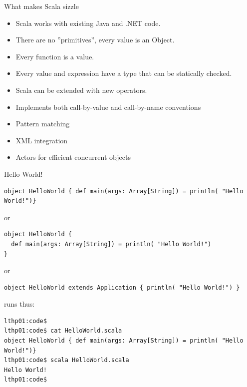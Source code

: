 \documentclass[t]{beamer}
\begin{document}

\begin{frame}{What makes Scala sizzle}
  \begin{itemize}
  \item Scala works with existing Java and .NET code.
  \item There are no ''primitives'', every value is an Object.
  \item Every function is a value.
  \item Every value and expression have a type that can be statically checked.
  \item Scala can be extended with new operators.
  \item Implements both call-by-value and call-by-name conventions
  \item Pattern matching
  \item XML integration
  \item Actors for efficient concurrent objects
  \end{itemize}
\note{}
 \end{frame}

\begin{frame}[fragile]{Hello World!}
  \begin{tiny}
  \begin{verbatim}
object HelloWorld { def main(args: Array[String]) = println( "Hello World!")}
  \end{verbatim}
  or
  \begin{verbatim}
object HelloWorld { 
  def main(args: Array[String]) = println( "Hello World!")
}
  \end{verbatim}
  or
  \begin{verbatim}
object HelloWorld extends Application { println( "Hello World!") }
  \end{verbatim}
  runs thus:
  \begin{verbatim}
lthp01:code$ 
lthp01:code$ cat HelloWorld.scala
object HelloWorld { def main(args: Array[String]) = println( "Hello World!")}
lthp01:code$ scala HelloWorld.scala
Hello World!
lthp01:code$ 
  \end{verbatim}
  \end{tiny}
  \note{}
\end{frame}
\end{document}
